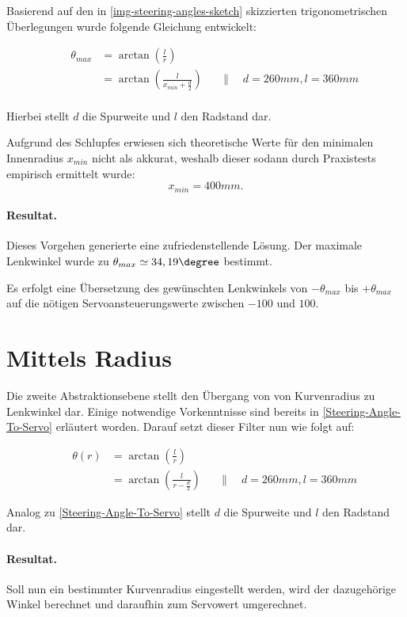 \documentclass[a4paper,12pt]{report}
\begin{document}
	Basierend auf den in \autoref{img-steering-angles-sketch} skizzierten trigonometrischen Überlegungen wurde folgende Gleichung entwickelt:
	
	\begin{align*}
		&&\theta_{max} &= \arctan\left( \frac{l}{r} \right)\\
		&&&= \arctan\left( \frac{l}{x_{min} + \frac{d}{2}} \right) &&\|\quad d = 260mm, l = 360mm
	\end{align*}
	\\
	Hierbei stellt $d$ die Spurweite und $l$ den Radstand dar.
	
	Aufgrund des Schlupfes erwiesen sich theoretische Werte für den minimalen Innenradius $x_{min}$ nicht als akkurat, weshalb dieser sodann durch  Praxistests %
	empirisch ermittelt wurde:
		\[x_{min} = 400mm.\] 
	
	\paragraph{Resultat.}
	Dieses Vorgehen generierte eine zufriedenstellende Lösung.
	Der maximale Lenkwinkel wurde zu $\theta_{max} \simeq 34,19\degree$ bestimmt.
	
	Es erfolgt eine Übersetzung des gewünschten Lenkwinkels von $-\theta_{max}$ bis $+\theta_{max}$ auf die nötigen Servoansteuerungswerte zwischen $-100$ und $100$.

\section{Mittels Radius}

	Die zweite Abstraktionsebene stellt den Übergang von von Kurvenradius zu Lenkwinkel dar.
	Einige notwendige Vorkenntnisse sind bereits in \autoref{Steering-Angle-To-Servo} erläutert worden.
	Darauf setzt dieser Filter nun wie folgt auf:
	
		\begin{align*}
		&&\theta\left(r\right) &= \arctan\left( \frac{l}{r} \right)\\
		&&&= \arctan\left( \frac{l}{r - \frac{d}{2}} \right) &&\|\quad d = 260mm, l = 360mm
		\end{align*}
	
	Analog zu \autoref{Steering-Angle-To-Servo} stellt $d$ die Spurweite und $l$ den Radstand dar.

	\paragraph{Resultat.}
	Soll nun ein bestimmter Kurvenradius eingestellt werden, wird der dazugehörige Winkel berechnet und daraufhin zum Servowert umgerechnet.
\end{document}
